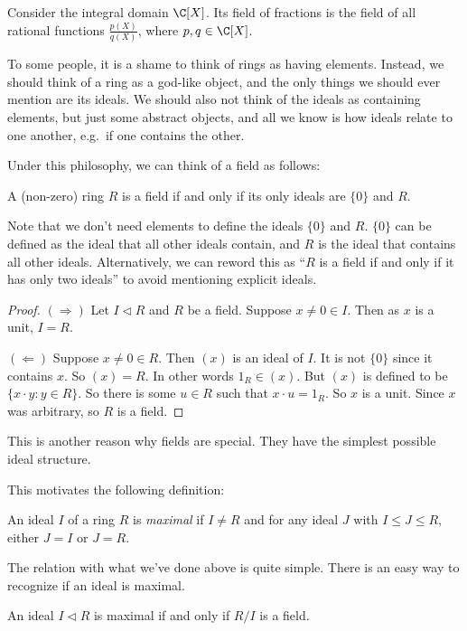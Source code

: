 \documentclass[a4paper]{article}
\begin{document}
\begin{eg}
  Consider the integral domain $\C[X]$. Its field of fractions is the field of all rational functions $\frac{p(X)}{q(X)}$, where $p, q \in \C[X]$.
\end{eg}
To some people, it is a shame to think of rings as having elements. Instead, we should think of a ring as a god-like object, and the only things we should ever mention are its ideals. We should also not think of the ideals as containing elements, but just some abstract objects, and all we know is how ideals relate to one another, e.g.\ if one contains the other.

Under this philosophy, we can think of a field as follows:
\begin{lemma}
  A (non-zero) ring $R$ is a field if and only if its only ideals are $\{0\}$ and $R$.
\end{lemma}
Note that we don't need elements to define the ideals $\{0\}$ and $R$. $\{0\}$ can be defined as the ideal that all other ideals contain, and $R$ is the ideal that contains all other ideals. Alternatively, we can reword this as ``$R$ is a field if and only if it has only two ideals'' to avoid mentioning explicit ideals.

\begin{proof}
  $(\Rightarrow)$ Let $I \lhd R$ and $R$ be a field. Suppose $x \not= 0 \in I$. Then as $x$ is a unit, $I = R$.

  $(\Leftarrow)$ Suppose $x \not= 0 \in R$. Then $(x)$ is an ideal of $I$. It is not $\{0\}$ since it contains $x$. So $(x) = R$. In other words $1_R \in (x)$. But $(x)$ is defined to be $\{x \cdot y: y \in R\}$. So there is some $u \in R$ such that $x\cdot u = 1_R$. So $x$ is a unit. Since $x$ was arbitrary, so $R$ is a field.
\end{proof}
This is another reason why fields are special. They have the simplest possible ideal structure.

This motivates the following definition:

\begin{defi}
  An ideal $I$ of a ring $R$ is \emph{maximal} if $I \not= R$ and for any ideal $J$ with $I \leq J \leq R$, either $J = I$ or $J = R$.
\end{defi}

The relation with what we've done above is quite simple. There is an easy way to recognize if an ideal is maximal.

\begin{lemma}
  An ideal $I \lhd R$ is maximal if and only if $R/I$ is a field.
\end{lemma}
\end{document}
